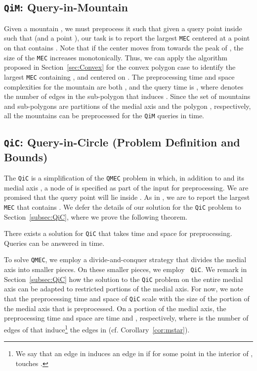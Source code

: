 \documentclass[12pt]{llncs}
\begin{document}
\vspace{-0.15in}
\subsection{{\tt QiM}: Query-in-Mountain}\label{subsec:MiM}
Given a mountain , we must preprocess it such that given a query point  inside  such that  (and a point ),
our task is to report the largest {\tt MEC}  centered at a point on  that contains 
. 
Note that if the center moves 
from  towards the peak of , the size of the 
{\tt MEC} increases monotonically. Thus, we can apply the algorithm proposed in 
Section\ \ref{sec:Convex} for the convex polygon case to identify the largest {\tt MEC}  
containing , and centered on . 
The preprocessing time and space complexities for the mountain  are both 
, and the query time is , where  denotes the 
number of edges in the sub-polygon   that induces . Since the 
set of mountains and sub-polygons are partitions of the medial axis  and the 
polygon , respectively, all the 
mountains can be preprocessed for the {\tt QiM} queries in  time. 


\subsection{{\tt QiC}: Query-in-Circle (Problem Definition and Bounds)} 
\label{qic_defn}
The {\tt QiC} is a simplification of the {\tt QMEC} problem in which, in addition to  and its medial
axis , a node  of    is 
specified as part of the input for preprocessing. We are  promised that 
the query point  will lie inside . As in , we are to report 
the largest {\tt MEC}  that contains . We defer the details of our solution for the 
{\tt QiC} problem to Section\ \ref{subsec:QiC}, where we prove the following theorem.
\begin{theorem}\label{thm:qic}
There exists a solution for {\tt QiC} that takes  time and  space for preprocessing.
Queries can be answered in  time.
\end{theorem}
To solve {\tt QMEC},  we employ a divide-and-conquer strategy that 
divides the medial axis into smaller pieces. On these smaller pieces, we employ {\tt 
QiC}. We remark in Section\ \ref{subsec:QiC} how the solution to the  {\tt QiC} 
problem on the entire medial axis can be adapted to restricted portions of the medial 
axis. For now, we note that the preprocessing time and space of {\tt QiC} scale with the size of the portion of the medial axis that is preprocessed.
On a  
portion  of the medial axis, the preprocessing time and space are  time and , respectively, where  is the number of edges of  that induce\footnote{We say that an edge  in 
 induces an edge   in  if for some point  in the interior of ,  
touches .} the edges in  (cf. Corollary\ \ref{cor:mstar}).
\end{document}
